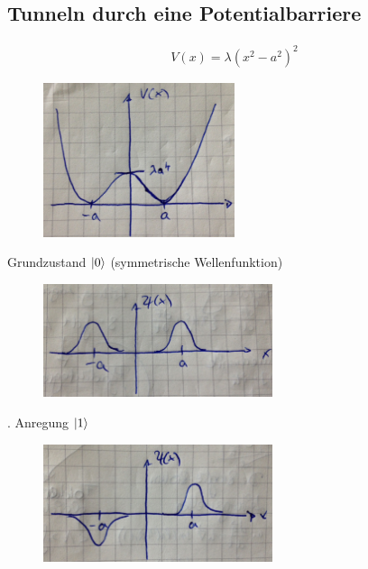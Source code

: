 \subsection{Tunneln durch eine Potentialbarriere}
	\begin{align*}
		V(x) = \lambda(x^2- a^2)^2
	\end{align*}
	\begin{figure}
		\begin{center}
			\includegraphics[width= 0.5\textwidth]{Tunneln_durch_eine_Potentialbarriere1}
		\end{center}
	\end{figure}
\FloatBarrier
Grundzustand $\ket{0}$ (symmetrische Wellenfunktion)
\FloatBarrier
	\begin{figure}[h]
		\begin{center}
			\includegraphics[width= 0.6\textwidth]{Tunneln_durch_eine_Potentialbarriere2}
		\end{center}
	\end{figure}
. Anregung $\ket{1}$
	\begin{figure} [h]
		\begin{center}
			\includegraphics[width= 0.6\textwidth]{Tunneln_durch_eine_Potentialbarriere3}
		\end{center}
	\end{figure}
